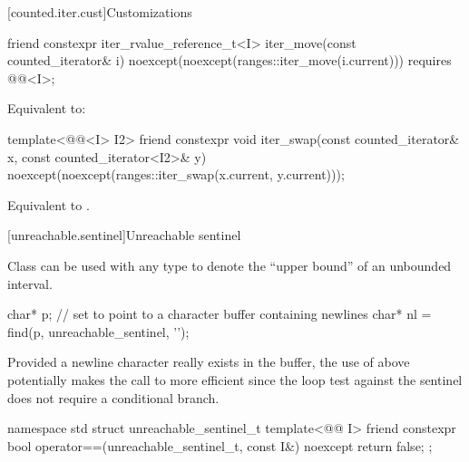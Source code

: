 [counted.iter.cust]{Customizations}

%
\begin{itemdecl}
friend constexpr iter_rvalue_reference_t<I>
  iter_move(const counted_iterator& i)
    noexcept(noexcept(ranges::iter_move(i.current)))
    requires @@<I>;
\end{itemdecl}

\begin{itemdescr}
\pnum
\effects
Equivalent to: 
\end{itemdescr}

%
\begin{itemdecl}
template<@@<I> I2>
  friend constexpr void
    iter_swap(const counted_iterator& x, const counted_iterator<I2>& y)
      noexcept(noexcept(ranges::iter_swap(x.current, y.current)));
\end{itemdecl}

\begin{itemdescr}
\pnum
\effects
Equivalent to .
\end{itemdescr}

[unreachable.sentinel]{Unreachable sentinel}

%
\pnum
Class  can be used with
any  type
to denote the ``upper bound'' of an unbounded interval.

\pnum
\begin{example}
\begin{codeblock}
char* p;
// set  to point to a character buffer containing newlines
char* nl = find(p, unreachable_sentinel, '\n');
\end{codeblock}

Provided a newline character really exists in the buffer, the use of
 above potentially makes the call to  more
efficient since the loop test against the sentinel does not require a
conditional branch.
\end{example}

%
\begin{codeblock}
namespace std {
  struct unreachable_sentinel_t {
    template<@@ I>
      friend constexpr bool operator==(unreachable_sentinel_t, const I&) noexcept
      { return false; }
  };
}
\end{codeblock}

